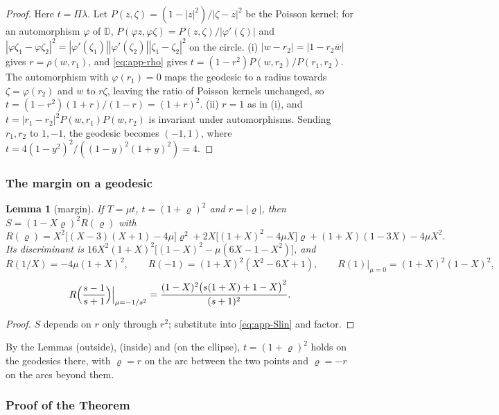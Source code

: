 \documentclass[11pt,reqno]{amsart}
\theoremstyle{plain}
\newtheorem*{lemma}{Lemma}
\theoremstyle{definition}
\theoremstyle{remark}
\begin{document}
\begin{proof}
Here $t=\Pi\lambda$. Let $P(z,\zeta)=(1-|z|^{2})/|\zeta-z|^{2}$ be the Poisson kernel; for an automorphism
$\varphi$ of $\mathbb D$, $P(\varphi z,\varphi\zeta)=P(z,\zeta)/|\varphi'(\zeta)|$ and
$|\varphi\zeta_1-\varphi\zeta_2|^{2}=|\varphi'(\zeta_1)||\varphi'(\zeta_2)||\zeta_1-\zeta_2|^{2}$ on the circle.
(i) $|w-r_2|=|1-r_2\bar w|$ gives $r=\rho(w,r_1)$, and \eqref{eq:app-rho} gives
$t=(1-r^{2})P(w,r_2)/P(r_1,r_2)$. The automorphism with $\varphi(r_1)=0$ maps the geodesic to a radius
towards $\zeta=\varphi(r_2)$ and $w$ to $r\zeta$, leaving the ratio of Poisson kernels unchanged, so
$t=(1-r^{2})(1+r)/(1-r)=(1+r)^{2}$. (ii) $r=1$ as in (i), and
$t=|r_1-r_2|^{2}P(w,r_1)P(w,r_2)$ is invariant under automorphisms. Sending $r_1,r_2$ to $1,-1$, the
geodesic becomes $(-1,1)$, where $t=4(1-y^{2})^{2}/((1-y)^{2}(1+y)^{2})=4$.
\end{proof}

\subsubsection{The margin on a geodesic}

\begin{lemma}[margin]
If $T=\mu t$, $t=(1+\varrho)^{2}$ and $r=|\varrho|$, then $S=(1-X\varrho)^{2}R(\varrho)$ with
\[
  R(\varrho)=X^{2}\bigl[(X-3)(X+1)-4\mu\bigr]\varrho^{2}+2X\bigl[(1+X)^{2}-4\mu X\bigr]\varrho
  +(1+X)(1-3X)-4\mu X^{2} .
\]
Its discriminant is $16X^{2}(1+X)^{2}\bigl[(1-X)^{2}-\mu(6X-1-X^{2})\bigr]$, and
\[
  R(1/X)=-4\mu(1+X)^{2},\qquad R(-1)=(1+X)^{2}(X^{2}-6X+1),\qquad R(1)\big|_{\mu=0}=(1+X)^{2}(1-X)^{2},
\]
\[
  R\Bigl(\frac{s-1}{s+1}\Bigr)\Big|_{\mu=-1/s^{2}}=\frac{(1-X)^{2}\bigl(s(1+X)+1-X\bigr)^{2}}{(s+1)^{2}} .
\]
\end{lemma}

\begin{proof}
$S$ depends on $r$ only through $r^{2}$; substitute into \eqref{eq:app-Slin} and factor.
\end{proof}

By the Lemmas (outside), (inside) and (on the ellipse), $t=(1+\varrho)^{2}$ holds on the geodesics there, with $\varrho=r$ on the
arc between the two points and $\varrho=-r$ on the arcs beyond them.

\subsubsection{Proof of the Theorem}
\end{document}
